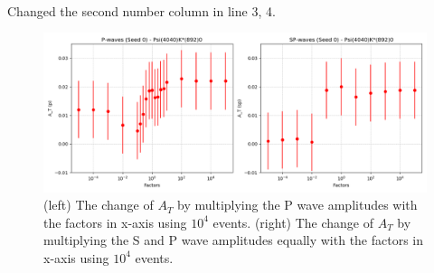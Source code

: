 \\
Changed the second number column in line 3, 4.
\begin{figure}[h]
\center
\includegraphics*[width=0.96\linewidth]{p_wave/spd_waves_sr3}
\caption{(left) The change of $A_T$ by multiplying the P wave amplitudes with the factors in x-axis using $10^4$ events. (right) The change of $A_T$ by multiplying the S and P wave amplitudes equally with the factors in x-axis using $10^4$ events.}
\label{spd_waves_sr3}
\end{figure}

